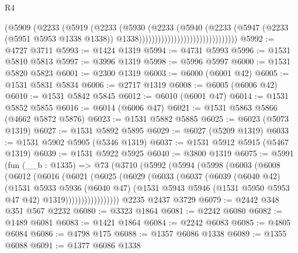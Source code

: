 \begin{lexlean}{R4}
\begin{coremodule}
                                                (@5909
                                                  (@2233
                                                    (@5919
                                                      (@2233
                                                        (@5930
                                                          (@2233
                                                            (@5940
                                                              (@2233
                                                                (@5947
                                                                  (@2233 (@5951 @5953 @1338 @1338))
                                                                  @1338)))))))))))))))))))))))))))))))
@5992 := @4727 @3711
@5993 := @1424 @1319
@5994 := @4731 @5993
@5996 := @1531 @5810 @5813
@5997 := @3996 @1319
@5998 := @5996 @5997
@6000 := @1531 @5820 @5823
@6001 := @2300 @1319
@6003 := @6000 (@6001 @42)
@6005 := @1531 @5831 @5834
@6006 := @2717 @1319
@6008 := @6005 (@6006 @42)
@6010 := @1531 @5842 @5845
@6012 := @6010 (@6001 @47)
@6014 := @1531 @5852 @5855
@6016 := @6014 (@6006 @47)
@6021 := @1531 @5863 @5866 (@4662 @5872 @5876)
@6023 := @1531 @5882 @5885
@6025 := @6023 (@5073 @1319)
@6027 := @1531 @5892 @5895
@6029 := @6027 (@5209 @1319)
@6033 := @1531 @5902 @5905 (@5346 @1319)
@6037 := @1531 @5912 @5915 (@5467 @1319)
@6039 := @1531 @5922 @5925
@6040 := @3800 @1319
@6075 := @5991
    (fun (__b : @1335) =>
    @73
      (@3710
        (@5992
          (@5994
            (@5998
              (@6003
                (@6008
                  (@6012
                    (@6016
                      (@6021
                        (@6025
                          (@6029
                            (@6033
                              (@6037
                                (@6039
                                  (@6040 @42)
                                  (@1531
                                    @5933
                                    @5936
                                    (@6040 @47)
                                    (@1531
                                      @5943
                                      @5946
                                      (@1531 @5950 @5953 @47 @42)
                                      @1319)))))))))))))))))
    @2235
    @2437
    @3729
@6079 := @2442 @348 @351 @567 @2232
@6080 := @3323 @1864
@6081 := @2242 @6080
@6082 := @1489 @6081
@6083 := @1421 @1864
@6084 := @2242 @6083
@6085 := @4805 @6084
@6086 := @4798 @175
@6088 := @1357 @6086 @1338
@6089 := @1355 @6088
@6091 := @1377 @6086 @1338

\end{coremodule}
\end{lexlean}
